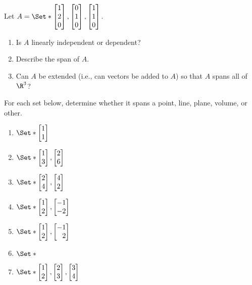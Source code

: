 \begin{exercises}

	\begin{problist}
		\prob Let $A=\Set*{\mat{1\\2\\0},\mat{0\\1\\0},\mat{1\\1\\0}}$.
		\begin{enumerate}
			\item Is $A$
				linearly independent or dependent?

			\item Describe the span of $A$.

			\item Can $A$ be extended (i.e., can vectors be added to $A$) so that
				$A$ spans all of $\R^3$?
		\end{enumerate}

		\prob For each set below, determine whether it spans a point,
		line, plane, volume, or other. \label{PROBSET3-SETS}
		\begin{enumerate}
			\item $\Set*{\mat{1\\1}}$

			\item $\Set*{\mat{1\\3},\mat{2\\6}}$

			\item $\Set*{\mat{2\\4},\mat{4\\2}}$

			\item $\Set*{\mat{1\\2},\mat{-1\\-2}}$

			\item $\Set*{\mat{1\\2},\mat{-1\\2}}$

			\item $\Set*{}$

			\item $\Set*{\mat{1\\2},\mat{2\\3},\mat{3\\4}}$


\end{enumerate}
\end{problist}
\end{exercises}
